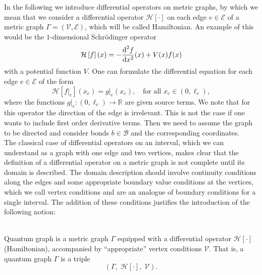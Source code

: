 In the following we introduce differential operators on metric graphs, by which we mean that we consider a differential operator $\mathcal{H} \left[ \cdot \right]$ on each edge $e \in \mathcal{E}$ of a metric graph $\Gamma = (\mathcal{V}, \mathcal{E})$, which will be called Hamiltonian. An example of this would be the $1$-dimensional Schrödinger operator
\begin{equation*}
    \mathcal{H} \left[ f \right](x) = -\frac{\textup{d}^2 f}{\textup{d} x^2}(x) + V(x)f(x)
\end{equation*}
with a potential function $V$. One can formulate the differential equation for each edge $e \in \mathcal{E}$ of the form
\begin{equation*}
    \mathcal{H} \left[ f |_e \right] (x_e) = g|_e(x_e), \quad \text{for all  } x_e \in (0, \ell_e),
\end{equation*}
where the functions $g|_e \colon (0, \ell_e) \to \mathbb{R}$ are given source terms. We note that for this operator the direction of the edge is irrelevant. This is not the case if one wants to include first order derivative terms. Then we need to assume the graph to be directed and consider bonds $b \in \mathcal{B}$ and the corresponding coordinates. \\
The classical case of differential operators on an interval, which we can understand as a graph with one edge and two vertices, makes clear that the definition of a differential operator on a metric graph is not complete until its domain is described. The domain description should involve continuity conditions along the edges and some appropriate boundary value conditions at the vertices, which we call vertex conditions and are an analogue of boundary conditions for a single interval. The addition of these conditions justifies the introduction of the following notion:

\begin{definition}\label{quantum graph} \ \\
    Quantum graph is a metric graph $\Gamma$ equipped with a differential operator $\mathcal{H} \left[ \cdot \right]$ (Hamiltonian), accompanied by “appropriate” vertex conditions $\mathcal{V}$. That is, a quantum graph $\Gamma$ is a triple
    \begin{equation*}
        (\Gamma, \; \mathcal{H} \left[ \cdot \right], \; \mathcal{V}).
    \end{equation*}
\end{definition}

